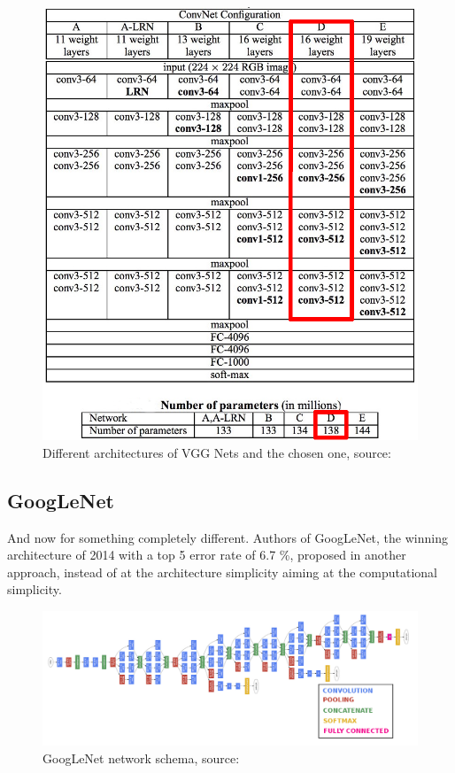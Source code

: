 \begin{figure}[H]
   \centering
	\includegraphics[width=0.8\linewidth]{./pictures/vgg-net.png}
	\caption[VGG Net networks]{Different architectures of VGG Nets and the chosen 
one, source: \cite{vgg}}
      \label{fig:vgg}
\end{figure}




\subsection{GoogLeNet}
\label{googlenet}

And now for something completely different. Authors of GoogLeNet, the winning 
architecture of  2014 with a top 5 error rate of 6.7 \%, proposed in 
\cite{googlenet} another approach, instead of at the architecture simplicity 
aiming at the computational simplicity.

\begin{figure}[H]
   \centering
	\includegraphics[width=\linewidth]{./pictures/googlenet.png}
	\caption[GoogLeNet networks]{GoogLeNet network schema, source: 
\cite{googlenet}}
      \label{fig:googlenet}
\end{figure}


